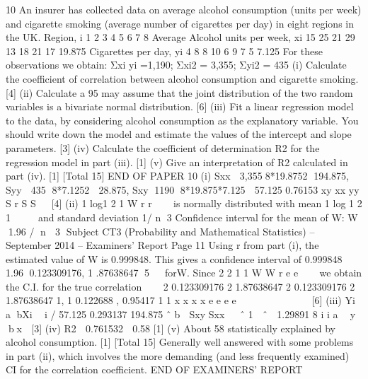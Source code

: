 
10 An insurer has collected data on average alcohol consumption (units per week) and
cigarette smoking (average number of cigarettes per day) in eight regions in the UK.
Region, i 1 2 3 4 5 6 7 8 Average
Alcohol units per week, xi 15 25 21 29 13 18 21 17 19.875
Cigarettes per day, yi 4 8 8 10 6 9 7 5 7.125
For these observations we obtain:
  Σxi yi =1,190; Σxi2 = 3,355; Σyi2 = 435
(i) Calculate the coefficient of correlation between alcohol consumption and
cigarette smoking. [4]
(ii) Calculate a 95%
may assume that the joint distribution of the two random variables is a
bivariate normal distribution. [6]
(iii) Fit a linear regression model to the data, by considering alcohol consumption
as the explanatory variable. You should write down the model and estimate
the values of the intercept and slope parameters. [3]
(iv) Calculate the coefficient of determination R2 for the regression model in
part (iii). [1]
(v) Give an interpretation of R2 calculated in part (iv). [1]
[Total 15]
END OF PAPER
10 (i) Sxx  3,3558*19.8752 194.875,
Syy  435 8*7.1252  28.875,
Sxy 1190 8*19.875*7.125  57.125
0.76153
xy
xx yy
S
r
S S
  [4]
(ii) 1 log1
2 1
W r
r



is normally distributed with mean 1 log 1
2 1
 
 
and standard
deviation 1/ n 3
Confidence interval for the mean of W: W 1.96 / n  3
Subject CT3 (Probability and Mathematical Statistics) – September 2014 – Examiners’ Report
Page 11
Using r from part (i), the estimated value of W is 0.999848.
This gives a confidence interval of
0.999848 1.96 0.123309176, 1 .87638647
5
  forW.
Since
2
2
1
1
W
W
r e
e



we obtain the C.I. for the true correlation 
 
2 0.123309176 2 1.87638647
2 0.123309176 2 1.87638647
1, 1 0.122688 , 0.95417
1 1
x x
x x
e e
e e
   
  
   
[6]
(iii) Yi  a bXi  i
/ 57.125 0.293137
194.875
ˆ b  Sxy Sxx  
ˆ 1  ˆ  1.29891
8 i i a  y bx  [3]
(iv) R2  0.761532  0.58 [1]
(v) About 58%
statistically explained by alcohol consumption. [1]
[Total 15]
Generally well answered with some problems in part (ii), which involves the more demanding
(and less frequently examined) CI for the correlation coefficient.
END OF EXAMINERS’ REPORT
